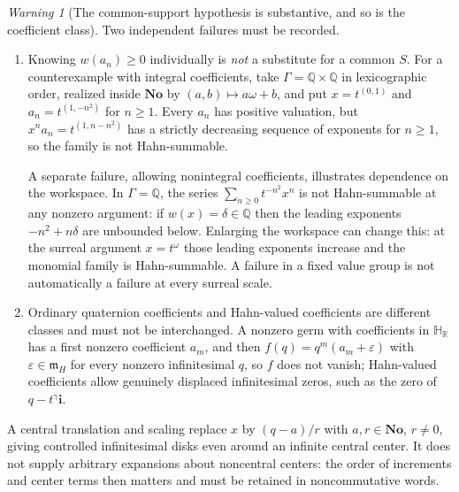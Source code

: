 \documentclass[11pt,letterpaper]{article}
\numberwithin{equation}{section}
\theoremstyle{definition}
\theoremstyle{remark}
\newtheorem{warning}[warning]{Warning}
\newcommand{\No}{\mathbf{No}}
\newcommand{\HR}{\mathbb H_{\mathbb R}}
\newcommand{\Q}{\mathbb Q}
\newcommand{\mm}{\mathfrak m}
\newcommand{\eps}{\varepsilon}
\newcommand{\ii}{\mathbf i}
\begin{document}
\begin{warning}[The common-support hypothesis is substantive, and so is the coefficient class]
\label{squat:warn:commonsupport}
Two independent failures must be recorded.
\begin{enumerate}[label=\textup{(\arabic*)},leftmargin=2.4em]
\item Knowing $w(a_n)\ge0$ individually is \emph{not} a substitute for a common $S$.
For a counterexample with integral coefficients, take $\Gamma=\Q\times\Q$ in
lexicographic order, realized inside $\No$ by $(a,b)\mapsto a\omega+b$, and put
$x=t^{(0,1)}$ and $a_n=t^{(1,-n^2)}$ for $n\ge1$. Every $a_n$ has positive valuation,
but $x^na_n=t^{(1,n-n^2)}$ has a strictly decreasing sequence of exponents for $n\ge1$,
so the family is not Hahn-summable.

A separate failure, allowing nonintegral coefficients, illustrates dependence on the
workspace. In $\Gamma=\Q$, the series $\sum_{n\ge0}t^{-n^2}x^n$ is not Hahn-summable at
any nonzero argument: if $w(x)=\delta\in\Q$ then the leading exponents $-n^2+n\delta$ are
unbounded below. Enlarging the workspace can change this: at the surreal argument
$x=t^\omega$ those leading exponents increase and the monomial family is Hahn-summable. A
failure in a fixed value group is not automatically a failure at every surreal scale.
\item Ordinary quaternion coefficients and Hahn-valued coefficients are different classes
and must not be interchanged. A nonzero germ with coefficients in $\HR$ has a first nonzero
coefficient $a_m$, and then $f(q)=q^m(a_m+\eps)$ with $\eps\in\mm_H$ for every nonzero
infinitesimal $q$, so $f$ does not vanish; Hahn-valued coefficients allow genuinely
displaced infinitesimal zeros, such as the zero of $q-t^\gamma\ii$.
\end{enumerate}
\end{warning}

A central translation and scaling replace $x$ by $(q-a)/r$ with $a,r\in\No$, $r\ne0$,
giving controlled infinitesimal disks even around an infinite central center. It does not
supply arbitrary expansions about noncentral centers: the order of increments and center
terms then matters and must be retained in noncommutative words.
\end{document}
